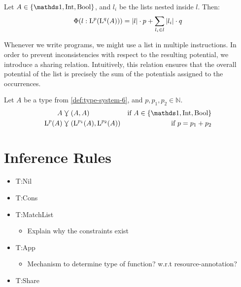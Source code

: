\begin{corollary}\label{cor:potential-nested-list}
   Let \(A \in \{\unit, \typeint, \bool\}\), and \(l_i\) be the lists nested inside \(l\). Then:
   \[
      \Phi(l : \text{L}^{p}(\text{L}^{q}(A))) = |l| \cdot p + \sum_{l_i \in l} |l_i| \cdot q
   \]
\end{corollary}

Whenever we write programs, we might use a list in multiple instructions. In order to prevent inconsistencies with respect to the resulting potential, we introduce a sharing relation. Intuitively, this relation ensures that the overall potential of the list is precisely the sum of the potentials assigned to the occurrences.

\begin{definition}
   Let \(A\) be a type from \cref{def:type-system-6}, and \(p, p_1, p_2 \in \mathbb{N}\).
   \begin{align*}
      A &\shares (A, A)                                           &\text{if } A \in \{\unit, \typeint, \bool\}\\
      \ralist{p}{A} &\shares (\ralist{p_1}{A}, \ralist{p_2}{A})   &\text{if } p = p_1 + p_2 
   \end{align*}
\end{definition}

\section{Inference Rules}

\begin{itemize}
   \item T:Nil
   \item T:Cons
   \item T:MatchList
      \begin{itemize}
         \item Explain why the constraints exist
      \end{itemize}
   \item T:App
      \begin{itemize}
         \item Mechanism to determine type of function? w.r.t resource-annotation?
      \end{itemize}
   \item T:Share
\end{itemize}

